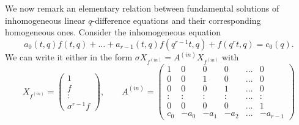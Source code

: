\documentclass[12pt,reqno]{amsart}
\theoremstyle{definition}
\def\s{\sigma}
\def\be{\begin{equation}}
\def\ee{\end{equation}}
\begin{document}
We now remark an elementary relation between fundamental solutions of
inhomogeneous linear $q$-difference equations and their corresponding
homogeneous ones. Consider the inhomogeneous equation
\be
 a_{0}(t,q)f(t,q)+\dots+ a_{r-1}(t,q)f(q^{r-1}t,q)+f(q^{r}t,q)=c_{0}(q).
\ee
We can write it either in the form $\s X_{f^{(in)}} = A^{(in)} X_{f^{(in)}}$
with 
{\tiny
  \begin{equation*}
   X_{f^{(in)}}
=
\begin{pmatrix}
1\\
f \\
:\\
\s^{r-1} f
\end{pmatrix},
\qquad
A^{(in)}
=
\begin{pmatrix}
1 & 0 & 0 & 0 & \dots & 0\\
0 & 0 & 1 & 0 & \dots & 0\\
0 & 0 & 0 & 1 & \dots & 0\\
: & : & : & : & \dots & :\\
0 & 0 & 0 & 0 & \dots & 1\\
c_{0} & - a_{0} & - a_{1} & - a_{2} & \dots & - a_{r-1}
\end{pmatrix}
\end{equation*}
}
\end{document}
